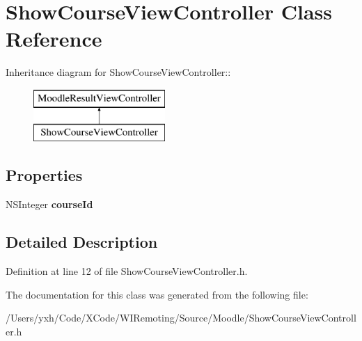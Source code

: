 \hypertarget{interface_show_course_view_controller}{
\section{ShowCourseViewController Class Reference}
\label{interface_show_course_view_controller}
}
Inheritance diagram for ShowCourseViewController::\begin{figure}[H]
\begin{center}
\leavevmode
\includegraphics[height=2cm]{interface_show_course_view_controller}
\end{center}
\end{figure}
\subsection*{Properties}
\begin{DoxyCompactItemize}
\item 
\hypertarget{interface_show_course_view_controller_a07437d4efb6935fe0c9339255f098d3e}{
NSInteger {\bfseries courseId}}
\label{interface_show_course_view_controller_a07437d4efb6935fe0c9339255f098d3e}

\end{DoxyCompactItemize}


\subsection{Detailed Description}


Definition at line 12 of file ShowCourseViewController.h.

The documentation for this class was generated from the following file:\begin{DoxyCompactItemize}
\item 
/Users/yxh/Code/XCode/WIRemoting/Source/Moodle/ShowCourseViewController.h\end{DoxyCompactItemize}
